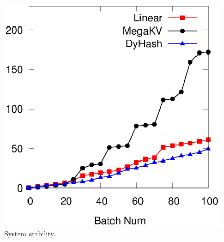 \begin{figure}[htp]
\begin{minipage}{0.19\linewidth}
		\centerline{\dsali}
	\end{minipage}
	\begin{minipage}{0.19\linewidth}\centering
		\includegraphics[width=\linewidth]{pic/dynamic-stability/dynamic-sta-random.eps}
		\centerline{\dsrandom}
	\end{minipage}
	\caption{System stability.}
	\label{fig:vary-alpha-stability}
\end{figure}

